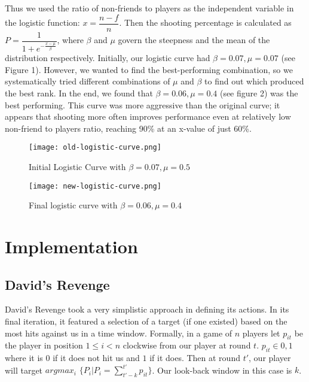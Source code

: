 \documentclass[
10pt, %
letterpaper, %
oneside, %
headinclude,footinclude, %
english
]{article}
\begin{document}
Thus we used the ratio of non-friends to players as the independent variable in the logistic function: $x = \dfrac{n - f}{n}$. Then the shooting percentage is calculated as $P = \dfrac{1}{1 + e^{-\frac{x - \mu}{\beta}}}$, where $\beta$ and $\mu$ govern the steepness and the mean of the distribution respectively. Initially, our logistic curve had $\beta=0.07,\mu=0.07$ (see Figure 1). However, we wanted to find the best-performing combination, so we systematically tried different combinations of $\mu$ and $\beta$ to find out which produced the best rank. In the end, we found that $\beta=0.06,\mu=0.4$ (see figure 2) was the best performing. This curve was more aggressive than the original curve; it appears that shooting more often improves performance even at relatively low non-friend to players ratio, reaching 90\% at an x-value of just 60\%.

\begin{figure}[h]
\centering
\texttt{[image: old-logistic-curve.png]}
\caption[Initial logistic curve with $\beta=0.07,\mu=0.5$]{Initial Logistic Curve with $\beta=0.07,\mu=0.5$}
\label{fig:gallery2}
\end{figure}

\begin{figure}[h]
\centering
\texttt{[image: new-logistic-curve.png]}
\caption[Final logistic curve with $\beta=0.06,\mu=0.4$]{Final logistic curve with $\beta=0.06,\mu=0.4$}
\label{fig:gallery3}
\end{figure}
\section{Implementation}

\subsection{David's Revenge}

David's Revenge took a very simplistic approach in defining its actions. In its final iteration, it featured a selection of a target (if one existed) based on the most hits against us in a time window. Formally, in a game of $n$ players let $p_{it}$ be the player in position $1\le i<n$ clockwise from our player at round $t$. $p_{it} \in {0,1}$ where it is $0$ if it does not hit us and $1$ if it does. Then at round $t'$, our player will target $argmax_i$ $\{P_i | P_i = \sum_{t'-k}^{t'}p_{it}\}$. Our look-back window in this case is $k$.
\end{document}
